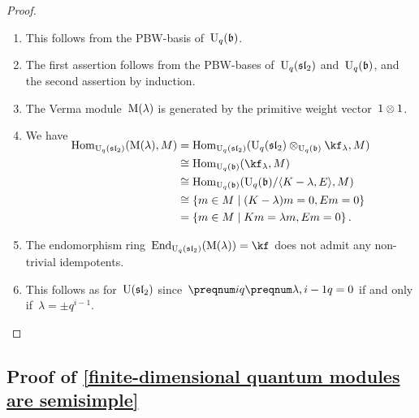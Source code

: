 \documentclass[a4paper, 11pt, oneside]{scrartcl}
\begin{document}
\begin{proof}
  \leavevmode
  \begin{enumerate}
    \item
      This follows from the PBW-basis of~$\operatorname{U}_q(\mathfrak{b})$.
    \item
      The first assertion follows from the PBW-bases of~$\operatorname{U}_q(\mathfrak{sl}_2)$ and~$\operatorname{U}_q(\mathfrak{b})$, and the second assertion by induction.
    \item
      The Verma module~$\operatorname{M}(\lambda)$ is generated by the primitive weight vector~$1 \otimes 1$.
    \item
      We have
      \begin{align*}
        \SwapAboveDisplaySkip
        \Hom_{\Univ_q(\sllie_2)}( \verma(\lambda), M )
        &=
        \Hom_{\Univ_q(\sllie_2)}( \Univ_q(\sllie_2) \tensor_{\Univ_q(\blie)} \kf_{\lambda}, M )
        \\
        &\cong
        \Hom_{\Univ_q(\blie)}( \kf_\lambda, M )
        \\
        &\cong
        \Hom_{\Univ_q(\blie)}( \Univ_q(\blie) / \gen{K - \lambda, E}, M)
        \\
        &\cong
        \{
          m \in M
        \suchthat
          (K - \lambda) m = 0,
          E m = 0
        \}
        \\
        &=
        \{
          m \in M
        \suchthat
          K m = \lambda m,
          E m = 0
        \} \,.
      \end{align*}
    \item
      The endomorphism ring~$\End_{\Univ_q(\sllie_2)}( \verma(\lambda) ) = \kf$ does not admit any non-trivial idempotents.
    \item
      This follows as for~$\operatorname{U}(\mathfrak{sl}_2)$ since~$\qnum{i} \qnum{\lambda, i-1} = 0$ if and only if~$\lambda = \pm q^{i-1}$.
      \qedhere
  \end{enumerate}
\end{proof}


\subsection{Proof of \cref{finite-dimensional quantum modules are semisimple}}
\label{proof of finite-dimensional quantum modules are semisimple}
\end{document}
